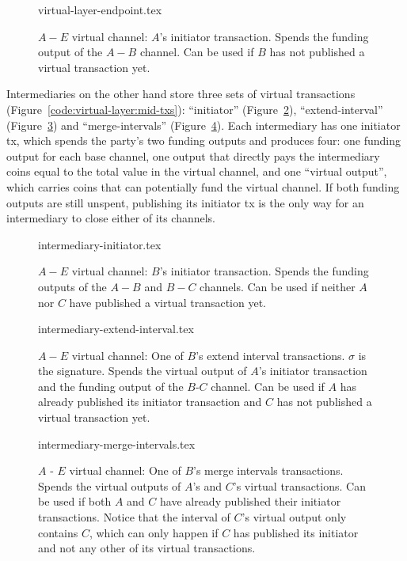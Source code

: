   \begin{figure}
    {virtual-layer-endpoint.tex}
    \caption{$A-E$ virtual channel: $A$'s initiator transaction. Spends the
    funding output of the $A-B$ channel. Can be used if $B$ has not published
    a virtual transaction yet.}
    \label{figure:virtual-layer-endpoint}
  \end{figure}

  Intermediaries on the other hand store three sets of virtual transactions
  (Figure~\ref{code:virtual-layer:mid-txs}): ``initiator''
  (Figure~\ref{figure:virtual-layer-initiator}), ``extend-interval''
  (Figure~\ref{figure:virtual-layer-extend-interval}) and ``merge-intervals''
  (Figure~\ref{figure:virtual-layer-merge-intervals}). Each intermediary has one
  initiator tx, which spends the party's two funding outputs and produces four:
  one funding output for each base channel, one output that directly pays the
  intermediary coins equal to the total value in the virtual channel, and one
  ``virtual output'', which carries coins that can potentially fund the virtual
  channel. If both funding outputs are still unspent, publishing its initiator
  tx is the only way for an intermediary to close either of its channels.

  \begin{figure}
    {intermediary-initiator.tex}
    \caption{$A-E$ virtual channel: $B$'s initiator transaction. Spends the
    funding outputs of the $A-B$ and $B-C$ channels. Can be used if neither
    $A$ nor $C$ have published a virtual transaction yet.}
    \label{figure:virtual-layer-initiator}
  \end{figure}

  \begin{figure}
    {intermediary-extend-interval.tex}
    \caption{$A-E$ virtual channel: One of $B$'s extend interval
    transactions. $\sigma$ is the signature. Spends the virtual output of $A$'s
    initiator transaction and the funding output of the $B$-$C$ channel. Can be
    used if $A$ has already published its initiator transaction and $C$ has not
    published a virtual transaction yet.}
    \label{figure:virtual-layer-extend-interval}
  \end{figure}

  \begin{figure}
    {intermediary-merge-intervals.tex}
    \caption{$A$ - $E$ virtual channel: One of $B$'s merge intervals
    transactions. Spends the virtual outputs of $A$'s and $C$'s virtual
    transactions. Can be used if both $A$ and $C$ have already published their
    initiator transactions. Notice that the interval of $C$'s virtual output
    only contains $C$, which can only happen if $C$ has published its initiator
    and not any other of its virtual transactions.}
    \label{figure:virtual-layer-merge-intervals}
  \end{figure}

